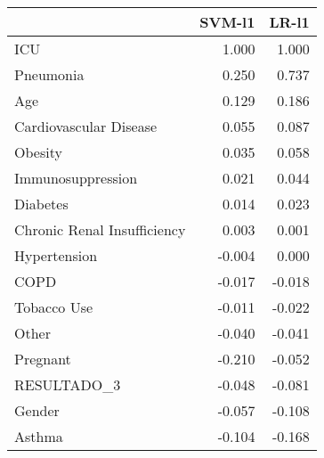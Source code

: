 \begin{tabular}{lrr}
\toprule
{} &  SVM-l1 &  LR-l1 \\
\midrule
ICU                         &   1.000 &  1.000 \\
Pneumonia                   &   0.250 &  0.737 \\
Age                         &   0.129 &  0.186 \\
Cardiovascular Disease      &   0.055 &  0.087 \\
Obesity                     &   0.035 &  0.058 \\
Immunosuppression           &   0.021 &  0.044 \\
Diabetes                    &   0.014 &  0.023 \\
Chronic Renal Insufficiency &   0.003 &  0.001 \\
Hypertension                &  -0.004 &  0.000 \\
COPD                        &  -0.017 & -0.018 \\
Tobacco Use                 &  -0.011 & -0.022 \\
Other                       &  -0.040 & -0.041 \\
Pregnant                    &  -0.210 & -0.052 \\
RESULTADO\_3                 &  -0.048 & -0.081 \\
Gender                      &  -0.057 & -0.108 \\
Asthma                      &  -0.104 & -0.168 \\
\bottomrule
\end{tabular}
